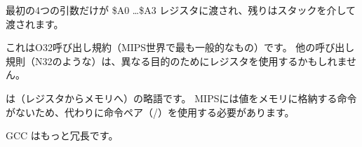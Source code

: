 


最初の4つの引数だけが \$A0 \dots \$A3 レジスタに渡され、残りはスタックを介して渡されます。

これはO32呼び出し規約（MIPS世界で最も一般的なもの）です。 
他の呼び出し規則（N32のような）は、異なる目的のためにレジスタを使用するかもしれません。


は（レジスタからメモリへ）の略語です。 
MIPSには値をメモリに格納する命令がないため、代わりに命令ペア（/）を使用する必要があります。






\NonOptimizing GCC はもっと冗長です。





